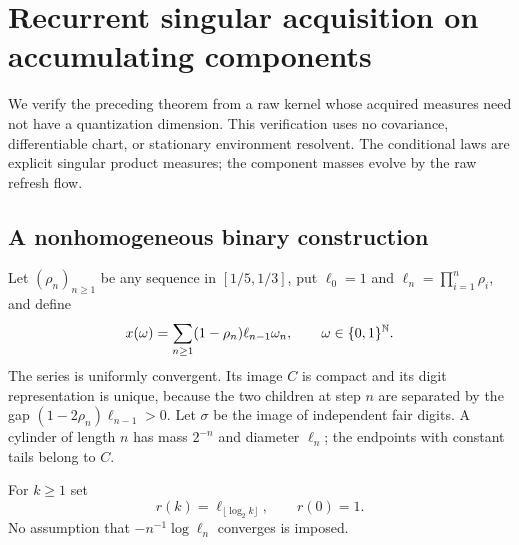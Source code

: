 \section{Recurrent singular acquisition on accumulating components}\label{sec:moran}
We verify the preceding theorem from a raw kernel whose acquired measures need not have a quantization dimension. This verification uses no covariance, differentiable chart, or stationary environment resolvent. The conditional laws are explicit singular product measures; the component masses evolve by the raw refresh flow.

\subsection{A nonhomogeneous binary construction}
Let $(\rho_n)_{n\ge1}$ be any sequence in $[1/5,1/3]$, put $\ell_0=1$ and $\ell_n=\prod_{i=1}^n\rho_i$, and define
\begin{equation}\label{eq:moran-map}
 x(\omega)=\sum_{n\ge1}(1-\rho_n)\ell_{n-1}\omega_n,
 \qquad \omega\in\{0,1\}^{\mathbb N}.
\end{equation}
The series is uniformly convergent. Its image $C$ is compact and its digit representation is unique, because the two children at step $n$ are separated by the gap $(1-2\rho_n)\ell_{n-1}>0$. Let $\sigma$ be the image of independent fair digits. A cylinder of length $n$ has mass $2^{-n}$ and diameter $\ell_n$; the endpoints with constant tails belong to $C$.

For $k\ge1$ set
\begin{equation}\label{eq:moran-profile}
 r(k)=\ell_{\lfloor\log_2k\rfloor},\qquad r(0)=1.
\end{equation}
No assumption that $-n^{-1}\log\ell_n$ converges is imposed.

